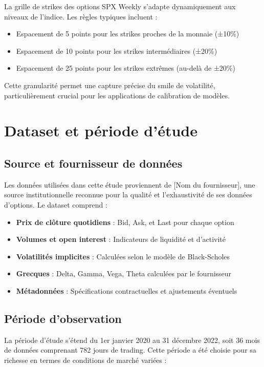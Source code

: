 La grille de strikes des options SPX Weekly s'adapte dynamiquement aux niveaux de l'indice. Les règles typiques incluent :
\begin{itemize}
\item Espacement de 5 points pour les strikes proches de la monnaie (±10\%)
\item Espacement de 10 points pour les strikes intermédiaires (±20\%)
\item Espacement de 25 points pour les strikes extrêmes (au-delà de ±20\%)
\end{itemize}

Cette granularité permet une capture précise du smile de volatilité, particulièrement crucial pour les applications de calibration de modèles.

\section{Dataset et période d'étude}

\subsection{Source et fournisseur de données}

Les données utilisées dans cette étude proviennent de [Nom du fournisseur], une source institutionnelle reconnue pour la qualité et l'exhaustivité de ses données d'options. Le dataset comprend :

\begin{itemize}
\item \textbf{Prix de clôture quotidiens} : Bid, Ask, et Last pour chaque option
\item \textbf{Volumes et open interest} : Indicateurs de liquidité et d'activité
\item \textbf{Volatilités implicites} : Calculées selon le modèle de Black-Scholes
\item \textbf{Grecques} : Delta, Gamma, Vega, Theta calculées par le fournisseur
\item \textbf{Métadonnées} : Spécifications contractuelles et ajustements éventuels
\end{itemize}

\subsection{Période d'observation}

La période d'étude s'étend du 1er janvier 2020 au 31 décembre 2022, soit 36 mois de données comprenant 782 jours de trading. Cette période a été choisie pour sa richesse en termes de conditions de marché variées :

